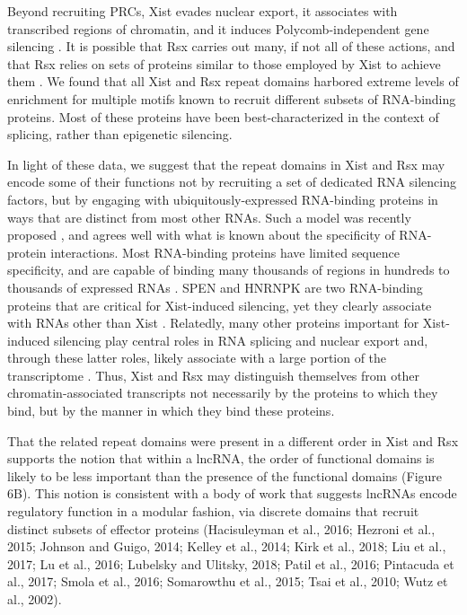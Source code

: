 Beyond recruiting PRCs, Xist evades nuclear export, it associates with transcribed regions of chromatin, and it induces Polycomb-independent gene silencing \cite{Balaton2018TheChromosome,Brockdorff2018LocalNcRNA,Sahakyan2018TheCompensation}. It is possible that Rsx carries out many, if not all of these actions, and that Rsx relies on sets of proteins similar to those employed by Xist to achieve them \cite{Grant2012RsxInactivation,Wang2014Chromosome-wideDomestica}. We found that all Xist and Rsx repeat domains harbored extreme levels of enrichment for multiple motifs known to recruit different subsets of RNA-binding proteins. Most of these proteins have been best-characterized in the context of splicing, rather than epigenetic silencing.

In light of these data, we suggest that the repeat domains in Xist and Rsx may encode some of their functions not by recruiting a set of dedicated RNA silencing factors, but by engaging with ubiquitously-expressed RNA-binding proteins in ways that are distinct from most other RNAs. Such a model was recently proposed \cite{Brockdorff2018LocalNcRNA}, and agrees well with what is known about the specificity of RNA-protein interactions. Most RNA-binding proteins have limited sequence specificity, and are capable of binding many thousands of regions in hundreds to thousands of expressed RNAs \cite{Dominguez2018SequenceProteins,Ray2013ARegulation,VanNostrand2016RobusteCLIP}. SPEN and HNRNPK are two RNA-binding proteins that are critical for Xist-induced silencing, yet they clearly associate with RNAs other than Xist \cite{Cirillo2016QuantitativeEditor,VanNostrand2016RobusteCLIP}. Relatedly, many other proteins important for Xist-induced silencing play central roles in RNA splicing and nuclear export and, through these latter roles, likely associate with a large portion of the transcriptome \cite{Moindrot2015ASilencing}. Thus, Xist and Rsx may distinguish themselves from other chromatin-associated transcripts not necessarily by the proteins to which they bind, but by the manner in which they bind these proteins.

That the related repeat domains were present in a different order in Xist and Rsx supports the notion that within a lncRNA, the order of functional domains is likely to be less important than the presence of the functional domains (Figure 6B). This notion is consistent with a body of work that suggests lncRNAs encode regulatory function in a modular fashion, via discrete domains that recruit distinct subsets of effector proteins (Hacisuleyman et al., 2016; Hezroni et al., 2015; Johnson and Guigo, 2014; Kelley et al., 2014; Kirk et al., 2018; Liu et al., 2017; Lu et al., 2016; Lubelsky and Ulitsky, 2018; Patil et al., 2016; Pintacuda et al., 2017; Smola et al., 2016; Somarowthu et al., 2015; Tsai et al., 2010; Wutz et al., 2002). 

